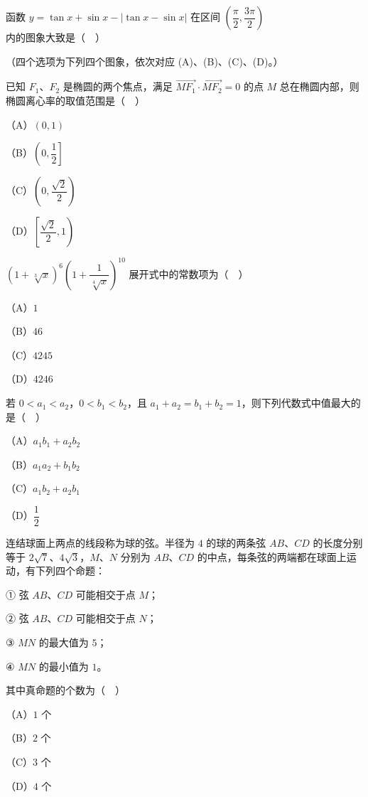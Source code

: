 \begin{question}
函数 $y=\tan x+\sin x-|\tan x-\sin x|$ 在区间 $\left(\dfrac{\pi}2,\dfrac{3\pi}2\right)$ 内的图象大致是（　）

（四个选项为下列四个图象，依次对应 (A)、(B)、(C)、(D)。）
\nopagebreak[4]
\begin{center}\end{center}
\nopagebreak[4]
\end{question}
\begin{question}
已知 $F_1$、$F_2$ 是椭圆的两个焦点，满足 $\overrightarrow{MF_1}\cdot\overrightarrow{MF_2}=0$ 的点 $M$ 总在椭圆内部，则椭圆离心率的取值范围是（　）

（A）$(0,1)$

（B）$\left(0,\dfrac12\right]$

（C）$\left(0,\dfrac{\sqrt2}2\right)$

（D）$\left[\dfrac{\sqrt2}2,1\right)$

\end{question}
\begin{question}
$(1+\sqrt[3]x)^6\left(1+\dfrac1{\sqrt[4]x}\right)^{10}$ 展开式中的常数项为（　）

（A）$1$

（B）$46$

（C）$4245$

（D）$4246$

\end{question}
\begin{question}
若 $0<a_1<a_2$，$0<b_1<b_2$，且 $a_1+a_2=b_1+b_2=1$，则下列代数式中值最大的是（　）

（A）$a_1b_1+a_2b_2$

（B）$a_1a_2+b_1b_2$

（C）$a_1b_2+a_2b_1$

（D）$\dfrac12$

\end{question}
\begin{question}
连结球面上两点的线段称为球的弦。半径为 $4$ 的球的两条弦 $AB$、$CD$ 的长度分别等于 $2\sqrt7$、$4\sqrt3$，$M$、$N$ 分别为 $AB$、$CD$ 的中点，每条弦的两端都在球面上运动，有下列四个命题：

① 弦 $AB$、$CD$ 可能相交于点 $M$；

② 弦 $AB$、$CD$ 可能相交于点 $N$；

③ $MN$ 的最大值为 $5$；

④ $MN$ 的最小值为 $1$。

其中真命题的个数为（　）

（A）$1$ 个

（B）$2$ 个

（C）$3$ 个

（D）$4$ 个

\end{question}
